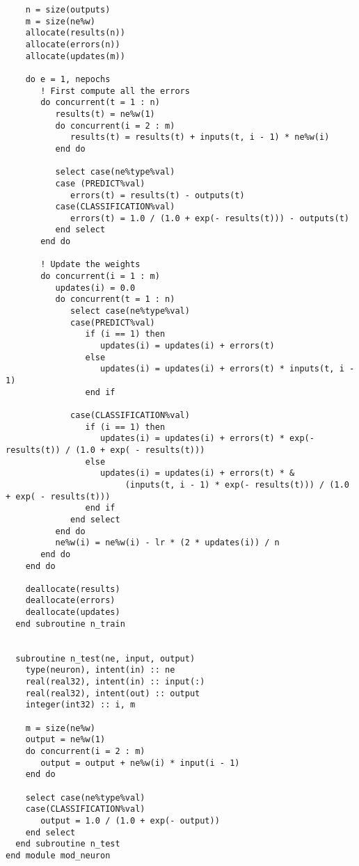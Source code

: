 \begin{lstlisting}
    n = size(outputs)
    m = size(ne%w)
    allocate(results(n))
    allocate(errors(n))
    allocate(updates(m))

    do e = 1, nepochs
       ! First compute all the errors
       do concurrent(t = 1 : n)
          results(t) = ne%w(1)
          do concurrent(i = 2 : m)
             results(t) = results(t) + inputs(t, i - 1) * ne%w(i)
          end do
          
          select case(ne%type%val)
          case (PREDICT%val)
             errors(t) = results(t) - outputs(t)
          case(CLASSIFICATION%val)
             errors(t) = 1.0 / (1.0 + exp(- results(t))) - outputs(t)
          end select
       end do

       ! Update the weights
       do concurrent(i = 1 : m)
          updates(i) = 0.0
          do concurrent(t = 1 : n)
             select case(ne%type%val)
             case(PREDICT%val)
                if (i == 1) then
                   updates(i) = updates(i) + errors(t)
                else
                   updates(i) = updates(i) + errors(t) * inputs(t, i - 1) 
                end if

             case(CLASSIFICATION%val)
                if (i == 1) then
                   updates(i) = updates(i) + errors(t) * exp(- results(t)) / (1.0 + exp( - results(t)))
                else
                   updates(i) = updates(i) + errors(t) * &
                        (inputs(t, i - 1) * exp(- results(t))) / (1.0 + exp( - results(t)))
                end if
             end select
          end do
          ne%w(i) = ne%w(i) - lr * (2 * updates(i)) / n
       end do
    end do
 
    deallocate(results)
    deallocate(errors)
    deallocate(updates)
  end subroutine n_train


  subroutine n_test(ne, input, output)
    type(neuron), intent(in) :: ne
    real(real32), intent(in) :: input(:)
    real(real32), intent(out) :: output
    integer(int32) :: i, m

    m = size(ne%w)
    output = ne%w(1)
    do concurrent(i = 2 : m)
       output = output + ne%w(i) * input(i - 1)
    end do

    select case(ne%type%val)
    case(CLASSIFICATION%val)
       output = 1.0 / (1.0 + exp(- output))
    end select
  end subroutine n_test
end module mod_neuron
\end{lstlisting}
